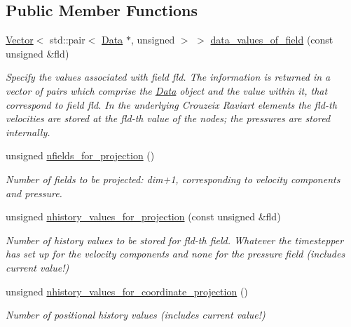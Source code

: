 \subsection*{Public Member Functions}
\begin{DoxyCompactItemize}
\item 
\hyperlink{classoomph_1_1Vector}{Vector}$<$ std\+::pair$<$ \hyperlink{classoomph_1_1Data}{Data} $\ast$, unsigned $>$ $>$ \hyperlink{classoomph_1_1ProjectableAxisymmetricCrouzeixRaviartElement_ae3768470d408e2d40f408e58d28792c2}{data\+\_\+values\+\_\+of\+\_\+field} (const unsigned \&fld)
\begin{DoxyCompactList}\small\item\em Specify the values associated with field fld. The information is returned in a vector of pairs which comprise the \hyperlink{classoomph_1_1Data}{Data} object and the value within it, that correspond to field fld. In the underlying Crouzeix Raviart elements the fld-\/th velocities are stored at the fld-\/th value of the nodes; the pressures are stored internally. \end{DoxyCompactList}\item 
unsigned \hyperlink{classoomph_1_1ProjectableAxisymmetricCrouzeixRaviartElement_a99ab07cbe191cc6d692e52d89bad0877}{nfields\+\_\+for\+\_\+projection} ()
\begin{DoxyCompactList}\small\item\em Number of fields to be projected\+: dim+1, corresponding to velocity components and pressure. \end{DoxyCompactList}\item 
unsigned \hyperlink{classoomph_1_1ProjectableAxisymmetricCrouzeixRaviartElement_a75392836bcf553edb6d75f7bbc60f111}{nhistory\+\_\+values\+\_\+for\+\_\+projection} (const unsigned \&fld)
\begin{DoxyCompactList}\small\item\em Number of history values to be stored for fld-\/th field. Whatever the timestepper has set up for the velocity components and none for the pressure field (includes current value!) \end{DoxyCompactList}\item 
unsigned \hyperlink{classoomph_1_1ProjectableAxisymmetricCrouzeixRaviartElement_a35e03deddcaceaea1909cfe14df631dd}{nhistory\+\_\+values\+\_\+for\+\_\+coordinate\+\_\+projection} ()
\begin{DoxyCompactList}\small\item\em Number of positional history values (includes current value!) \end{DoxyCompactList}\item 

\end{DoxyCompactItemize}
